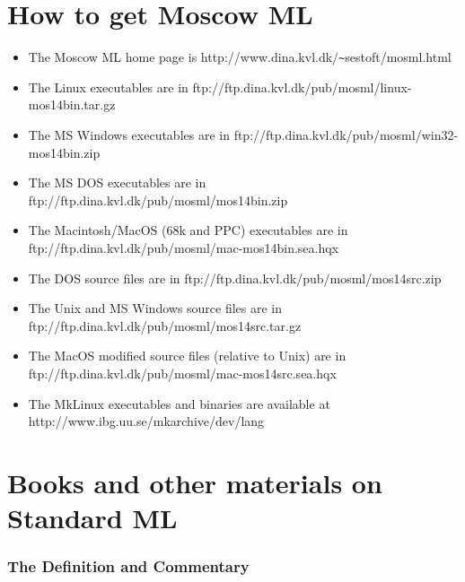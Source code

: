\documentclass[fleqn]{article}
\begin{document}
\section{How to get Moscow ML}
\label{sec-how-to-get}

\begin{itemize}
\item The Moscow ML home page is
        http://www.dina.kvl.dk/\verb#~#sestoft/mosml.html
\item The Linux executables are in
        ftp://ftp.dina.kvl.dk/pub/mosml/linux-mos14bin.tar.gz
\item The MS Windows executables are in 
        ftp://ftp.dina.kvl.dk/pub/mosml/win32-mos14bin.zip
\item The MS DOS executables are in 
        ftp://ftp.dina.kvl.dk/pub/mosml/mos14bin.zip
\item The Macintosh/MacOS (68k and PPC) executables are in\\
        ftp://ftp.dina.kvl.dk/pub/mosml/mac-mos14bin.sea.hqx
\item The DOS source files are in 
        ftp://ftp.dina.kvl.dk/pub/mosml/mos14src.zip
\item The Unix and MS Windows source files are in 
        ftp://ftp.dina.kvl.dk/pub/mosml/mos14src.tar.gz
\item The MacOS modified source files (relative to Unix) are in\\
        ftp://ftp.dina.kvl.dk/pub/mosml/mac-mos14src.sea.hqx
\item The MkLinux executables and binaries are available at \\
        http://www.ibg.uu.se/mkarchive/dev/lang
\end{itemize}



\section{Books and other materials on Standard ML}
\label{sec-books}

\subsubsection*{The Definition and Commentary}
\end{document}
